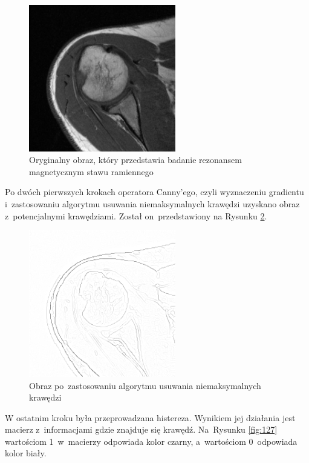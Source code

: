 \documentclass[a4paper,11pt,twoside,openright]{report}
\theoremstyle{definition}
\begin{document}
\pagebreak

\begin{figure}[h!]
	\center
	\includegraphics[width=0.57\textwidth]{123}
	\caption{Oryginalny obraz, który przedstawia badanie rezonansem magnetycznym stawu ramiennego}
    	\label{fig:123}
\end{figure}

Po dwóch pierwszych krokach operatora Canny'ego, czyli wyznaczeniu gradientu i~zastosowaniu algorytmu
usuwania niemaksymalnych krawędzi uzyskano obraz z~potencjalnymi krawędziami. Został on~przedstawiony
na Rysunku \ref{fig:126}.

\begin{figure}[h!]
	\center
	\includegraphics[width=0.57\textwidth]{126}
	\caption{Obraz po~zastosowaniu algorytmu usuwania niemaksymalnych krawędzi}
    	\label{fig:126}
\end{figure}

W ostatnim kroku była przeprowadzana histereza. Wynikiem jej działania jest macierz z~informacjami
gdzie znajduje się krawędź. Na~Rysunku \ref{fig:127} wartościom 1~w~macierzy odpowiada kolor czarny,
a~wartościom 0~odpowiada kolor biały.
\end{document}
